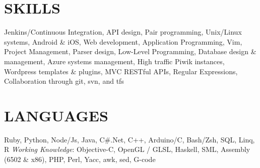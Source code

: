 \documentclass[line,margin]{res}
\begin{document}
\begin{resume}
\section{SKILLS}
Jenkins/Continuous Integration, API design, Pair programming, Unix/Linux systems,  Android \& iOS, Web development, Application Programming, Vim, Project Management, Parser design, Low-Level Programming, Database design \& management, Azure systems management, High traffic Piwik instances, Wordpress templates \& plugins, MVC RESTful APIs, Regular Expressions, Collaboration through git, svn, and tfs

\clearpage 
\section{LANGUAGES}
Ruby, Python, Node/Js, Java, C\#.Net, C++, Arduino/C, Bash/Zsh, SQL, Linq, R
\textit{Working Knowledge}: Objective-C, OpenGL / GLSL, Haskell, SML, Assembly (6502 \& x86), PHP, Perl, Yacc, awk, sed, G-code


\end{resume}
\end{document}
